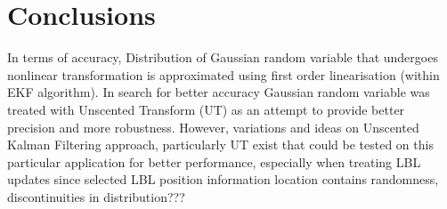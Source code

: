 \chapter{Conclusions} \label{chap:conclusions}

In terms of accuracy, Distribution of Gaussian random variable that undergoes nonlinear transformation is approximated using first order linearisation (within EKF algorithm). In search for better accuracy Gaussian random variable was treated with Unscented Transform (UT) as an attempt to provide better precision and more robustness. However, variations and ideas on Unscented Kalman Filtering approach, particularly UT exist \cite{julier02,van01} that could be tested on this particular application for better performance, especially when treating LBL updates since selected LBL position information location contains randomness, discontinuities in distribution???  
